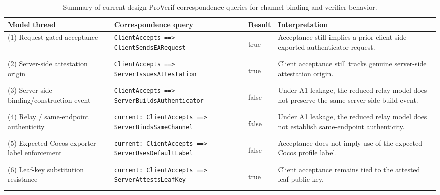 \documentclass[11pt,a4paper]{article}
\newcommand{\resulttrue}{\colorbox{statusgreen}{\strut true}}
\newcommand{\resultfalse}{\colorbox{riskred}{\strut false}}
\begin{document}
\begin{table}[H]
\centering
\footnotesize
\begin{tabularx}{\textwidth}{@{}>{\raggedright\arraybackslash}p{}>{\raggedright\arraybackslash}p{}>{\centering\arraybackslash}p{}>{\raggedright\arraybackslash}X@{}}
\toprule
\textbf{Model thread} & \textbf{Correspondence query} & \textbf{Result} & \textbf{Interpretation} \\
\midrule
(1) Request-gated acceptance &
\texttt{ClientAccepts ==> ClientSendsEARequest} &
\resulttrue{} &
Acceptance still implies a prior client-side exported-authenticator request. \\
(2) Server-side attestation origin &
\texttt{ClientAccepts ==> ServerIssuesAttestation} &
\resulttrue{} &
Client acceptance still tracks genuine server-side attestation origin. \\
(3) Server-side binding/construction event &
\texttt{ClientAccepts ==> ServerBuildsAuthenticator} &
\resultfalse{} &
Under A1 leakage, the reduced relay model does not preserve the same server-side build event. \\
(4) Relay / same-endpoint authenticity &
\texttt{current: ClientAccepts ==> ServerBindsSameChannel} &
\resultfalse{} &
Under A1 leakage, the reduced relay model does not establish same-endpoint authenticity. \\
(5) Expected Cocos exporter-label enforcement &
\texttt{current: ClientAccepts ==> ServerUsesDefaultLabel} &
\resultfalse{} &
Acceptance does not imply use of the expected Cocos profile label. \\
(6) Leaf-key substitution resistance &
\texttt{current: ClientAccepts ==> ServerAttestsLeafKey} &
\resulttrue{} &
Client acceptance remains tied to the attested leaf public key. \\
\bottomrule
\end{tabularx}
\caption{Summary of current-design ProVerif correspondence queries for channel binding and verifier behavior.}
\label{tab:proverif-results}
\end{table}
\end{document}
